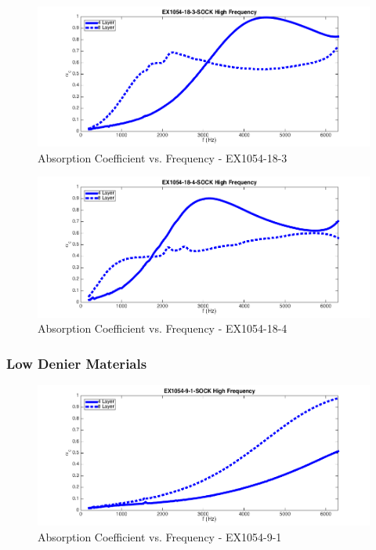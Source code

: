 \begin{figure}[hbtp]
    \centering
    \includegraphics[width=1\textwidth]{Chapter-4/figs/AfigSOCK18-3}
    \caption{Absorption Coefficient vs. Frequency - EX1054-18-3}
    \label{fig:AfigSOCK18-3}
\end{figure}

\begin{figure}[hbtp]
    \centering
    \includegraphics[width=1\textwidth]{Chapter-4/figs/AfigSOCK18-4}
    \caption{Absorption Coefficient vs. Frequency - EX1054-18-4}
    \label{fig:AfigSOCK18-4}
\end{figure}
\clearpage

\subsubsection{Low Denier Materials}

\begin{figure}[hbtp]
    \centering
    \includegraphics[width=1\textwidth]{Chapter-4/figs/AfigSOCK9-1}
    \caption{Absorption Coefficient vs. Frequency - EX1054-9-1}
    \label{fig:AfigSOCK9-1}
\end{figure}

